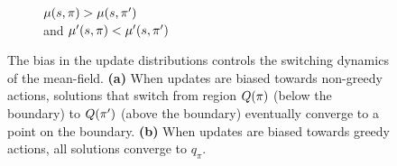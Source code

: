 \begin{figure}[h]
\begin{subfigure}[b]{0.48\textwidth}
        \caption{\centering $\mu(s, \pi) > \mu(s, \pi')$ \\ and $\mu'(s, \pi) < \mu'(s, \pi')$}
        \label{fig: explain effect of bias both sides boundary b}
    \end{subfigure}%
\vspace{1.5cm}
    \caption{The bias in the update distributions controls the switching dynamics of the mean-field.
    \textbf{\sffamily (a)} When updates are biased towards non-greedy actions, solutions that switch from region $Q(\pi)$ (below the boundary) to $Q(\pi')$ (above the boundary) eventually converge to a point on the boundary.
    \textbf{\sffamily (b)} When updates are biased towards greedy actions, all solutions converge to $q_\pi$.}
    \label{fig: explain effect of bias both sides boundary}
\end{figure}
